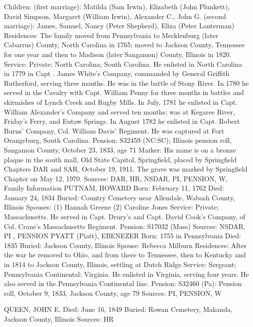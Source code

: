 Children: (first marriage): Matilda (Sam Irwin), Elizabeth (John Plunkett), David Simpson, Margaret (William 				Irwin), Alexander C., John G. 
	  (second marriage): James, Samuel, Nancy (Peter Shepherd), Eliza (Peter Lanterman) 
Residences: The family moved from Pennsylvania to Mecklenburg (later Cabarrus) County, North Carolina in 1765; moved to Jackson County, Tennessee for one year and then to Madison (later Sangamon) County, Illinois in 1820. 
Service: Private; North Carolina; South Carolina. He enlisted in North Carolina in 1779 in Capt . James White's Company, commanded by General Griffith Rutherford, serving three months. He was in the battle of Stony River. In 1780 he served in the Cavalry with Capt. William Penny for three months in battles and skirmishes of Lynch Creek and Rugby Mills. In July, 1781 he enlisted in Capt. William Alexander's Company and served ten months; was at Kegaree River, Friday's Ferry, and Eutaw Springs. In August 1782 he enlisted in Capt. Robert Burns' Company, Col. William Davis' Regiment. He was captured at Fort Orangeburg, South Carolina. 
Pension: S32459 (NC:SC); Illinois pension roll, Sangamon County, October 23, 1833, age 71 
Marker: His name is on a bronze plaque in the south mall, Old State Capitol, Springfield, placed by Springfield Chapters DAR and SAR, October 19, 1911. The grave was marked by Springfield Chapter on May 12, 1970. 
Sources: DAR, HR, NSDAR, PI, PENSION, W, Family Information 
PUTNAM, HOWARD
Born: February 11, 1762
Died: January 24, 1834
Buried: Country Cemetery near Allendale, Wabash County, Illinois 
Spouses: (1) Hannah Greene
	 (2) Caroline Jones
Service: Private; Massachusetts. He served in Capt. Drury's and Capt. David Cook's Company, of Col. Crane's Massachusetts Regiment. 
Pension: S17032 (Mass) 
Sources: NSDAR, PI , PENSION 
PYATT (Piatt), EBENEZER
Born: 1755 in Pennsylvania
Died: 1835
Buried: Jackson County, Illinois 
Spouse: Rebecca Milburn
Residences: After the war he removed to Ohio, and from there to Tennessee, then to Kentucky and in 1814 to Jackson County, Illinois, settling at Dutch Ridge
Service: Sergeant; Pennsylvania Continental: Virginia. He enlisted in Virginia, serving four years. He also served in the Pennsylvania Continental line. 
Pension: S32460 (Pa): Pension roll, October 9, 1833, Jackson County, age 79 
Sources: PI, PENSION, W 

QUEEN, JOHN E. 
Died: June 16, 1849 
Buried: Rowan Cemetery, Makanda, Jackson County, Illinois 
Sources: HR 

